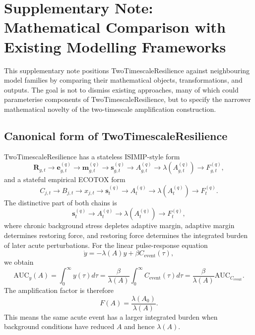 \clearpage
\appendix
\section{Supplementary Note: Mathematical Comparison with Existing Modelling Frameworks}
\label{supp:comparison}

This supplementary note positions TwoTimescaleResilience against neighbouring model families by comparing their mathematical objects, transformations, and outputs. The goal is not to dismiss existing approaches, many of which could parameterise components of TwoTimescaleResilience, but to specify the narrower mathematical novelty of the two-timescale amplification construction.

\subsection{Canonical form of TwoTimescaleResilience}

TwoTimescaleResilience has a stateless ISIMIP-style form
\begin{equation}
  \mathbf{R}_{g,t}
  \rightarrow \mathbf{e}^{(q)}_{g,t}
  \rightarrow \mathbf{m}^{(q)}_{g,t}
  \rightarrow \mathbf{s}^{(q)}_{g,t}
  \rightarrow A^{(q)}_{g,t}
  \rightarrow \lambda(A^{(q)}_{g,t})
  \rightarrow F^{(q)}_{g,t},
\end{equation}
and a stateful empirical ECOTOX form
\begin{equation}
  C_{j,t}\rightarrow B_{j,t}\rightarrow x_{j,t}\rightarrow \mathbf{s}^{(q)}_{t}\rightarrow A^{(q)}_t\rightarrow \lambda(A^{(q)}_t)\rightarrow F^{(q)}_t.
\end{equation}
The distinctive part of both chains is
\begin{equation}
  \mathbf{s}^{(q)}_{t}\rightarrow A^{(q)}_{t}\rightarrow \lambda(A^{(q)}_{t})\rightarrow F^{(q)}_{t},
\end{equation}
where chronic background stress depletes adaptive margin, adaptive margin determines restoring force, and restoring force determines the integrated burden of later acute perturbations. For the linear pulse-response equation
\begin{equation}
  \dot{y}=-\lambda(A)y+\beta C_{\mathrm{event}}(\tau),
\end{equation}
we obtain
\begin{equation}
  \mathrm{AUC}_y(A)=\int_0^\infty y(\tau)d\tau
  =\frac{\beta}{\lambda(A)}\int_0^\infty C_{\mathrm{event}}(\tau)d\tau
  =\frac{\beta}{\lambda(A)}\mathrm{AUC}_{C_{\mathrm{event}}}.
\end{equation}
The amplification factor is therefore
\begin{equation}
  F(A)=\frac{\lambda(A_0)}{\lambda(A)}.
\end{equation}
This means the same acute event has a larger integrated burden when background conditions have reduced $A$ and hence $\lambda(A)$.

